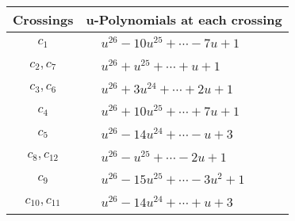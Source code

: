 \documentclass[1p]{elsarticle_modified}
\theoremstyle{definition}
\begin{document}
\begin{tabular}{m{50pt}|m{274pt}}
Crossings & \hspace{64pt}u-Polynomials at each crossing \\
\hline $$\begin{aligned}c_{1}\end{aligned}$$&$\begin{aligned}
&u^{26}-10 u^{25}+\cdots-7 u+1
\end{aligned}$\\
\hline $$\begin{aligned}c_{2},c_{7}\end{aligned}$$&$\begin{aligned}
&u^{26}+u^{25}+\cdots+u+1
\end{aligned}$\\
\hline $$\begin{aligned}c_{3},c_{6}\end{aligned}$$&$\begin{aligned}
&u^{26}+3 u^{24}+\cdots+2 u+1
\end{aligned}$\\
\hline $$\begin{aligned}c_{4}\end{aligned}$$&$\begin{aligned}
&u^{26}+10 u^{25}+\cdots+7 u+1
\end{aligned}$\\
\hline $$\begin{aligned}c_{5}\end{aligned}$$&$\begin{aligned}
&u^{26}-14 u^{24}+\cdots- u+3
\end{aligned}$\\
\hline $$\begin{aligned}c_{8},c_{12}\end{aligned}$$&$\begin{aligned}
&u^{26}- u^{25}+\cdots-2 u+1
\end{aligned}$\\
\hline $$\begin{aligned}c_{9}\end{aligned}$$&$\begin{aligned}
&u^{26}-15 u^{25}+\cdots-3 u^2+1
\end{aligned}$\\
\hline $$\begin{aligned}c_{10},c_{11}\end{aligned}$$&$\begin{aligned}
&u^{26}-14 u^{24}+\cdots+u+3
\end{aligned}$\\
\hline
\end{tabular}\\~\\
\end{document}
